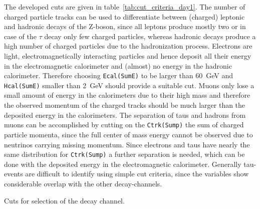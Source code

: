 \documentclass[11pt, a4paper]{article}
\numberwithin{equation}{section}
\begin{document}
The developed cuts are given in table~\ref{tab:cut_criteria_day1}.
The number of charged particle tracks can be used to differentiate between (charged) leptonic and hadronic decays of the Z-boson, since all leptons produce mostly two or in case of the $\tau$ decay only few charged particles, whereas hadronic decays produce a high number of charged particles due to the hadronization process.
Electrons are light, electromagnetically interacting particles and hence deposit all their energy in the electromagnetic calorimeter and (almost) no energy in the hadronic calorimeter.
Therefore choosing \texttt{Ecal(SumE)} to be larger than \SI{60}{GeV} and \texttt{Hcal(SumE)} smaller than \SI{2}{GeV} should provide a suitable cut.
Muons only lose a small amount of energy in the calorimeters due to their high mass and therefore the observed momentum of the charged tracks should be much larger than the deposited energy in the calorimeters.
The separation of taus and hadrons from muons can be accomplished by cutting on the \texttt{Ctrk(Sump)} the sum of charged particle momenta, since the full center of mass energy cannot be observed due to neutrinos carrying missing momentum.
Since electrons and taus have nearly the same distribution for \texttt{Ctrk(Sump)} a further separation is needed, which can be done with the deposited energy in the electromagnetic calorimeter.
Generally tau-events are difficult to identify using simple cut criteria, since the variables show considerable overlap with the other decay-channels.
\begin{table}[htb]
	\centering
	
	\caption{Cuts for selection of the decay channel.}
	\label{tab:cut_criteria_day1}
\end{table}
\end{document}
